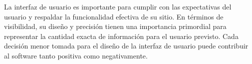 
La interfaz de usuario es importante para cumplir con las expectativas del usuario y respaldar la funcionalidad efectiva de su sitio.  En términos de visibilidad, su diseño y precisión tienen una importancia primordial para representar la cantidad exacta de información para el usuario previsto. Cada decisión menor tomada para el diseño de la interfaz de usuario puede contribuir al software tanto positiva como negativamente.


